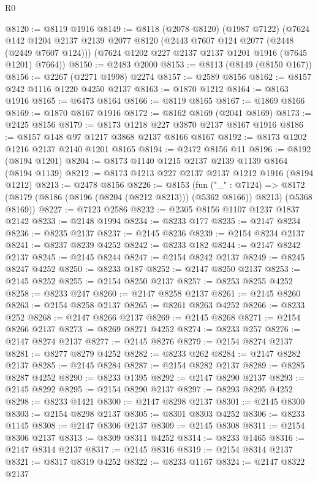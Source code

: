 \begin{lexlean}{R0}
\begin{coremodule}
@8120 := @8119 @1916
@8149 := @8118
    (@2078 @8120)
    (@1987 @7122)
    (@7624
      @142
      @1204
      @2137
      @2139
      @2077
      @8120
      (@2443 @7607 @124 @2077 (@2448 (@2449 @7607 @124)))
      (@7624 @1202 @227 @2137 @2137 @1201 @1916 (@7645 @1201) @7664))
@8150 := @2483 @2000
@8153 := @8113 (@8149 (@8150 @167))
@8156 := @2267 (@2271 @1998) @2274
@8157 := @2589 @8156
@8162 := @8157 @242 @1116 @1220 @4250 @2137
@8163 := @1870 @1212
@8164 := @8163 @1916
@8165 := @6473 @8164
@8166 := @8119 @8165
@8167 := @1869 @8166
@8169 := @1870 @8167 @1916
@8172 := @8162 @8169 (@2041 @8169)
@8173 := @2425 @8156
@8179 := @8173 @1218 @227 @3870 @2137 @8167 @1916
@8186 := @8157 @148 @97 @1217 @3868 @2137 @8166 @8167
@8192 := @8173 @1202 @1216 @2137 @2140 @1201 @8165
@8194 := @2472 @8156 @11
@8196 := @8192 (@8194 @1201)
@8204 := @8173 @1140 @1215 @2137 @2139 @1139 @8164 (@8194 @1139)
@8212 := @8173 @1213 @227 @2137 @2137 @1212 @1916 (@8194 @1212)
@8213 := @2478 @8156
@8226 := @8153
    (fun ("_" : @7124) =>
    @8172 (@8179 (@8186 (@8196 (@8204 (@8212 @8213))) (@5362 @8166)) @8213) (@5368 @8169))
@8227 := @7123 @2586
@8232 := @2305 @8156 @1107 @1237 @1837 @2142
@8233 := @2148 @1994
@8234 := @8233 @177
@8235 := @2147 @8234
@8236 := @8235 @2137
@8237 := @2145 @8236
@8239 := @2154 @8234 @2137
@8241 := @8237 @8239 @4252
@8242 := @8233 @182
@8244 := @2147 @8242 @2137
@8245 := @2145 @8244
@8247 := @2154 @8242 @2137
@8249 := @8245 @8247 @4252
@8250 := @8233 @187
@8252 := @2147 @8250 @2137
@8253 := @2145 @8252
@8255 := @2154 @8250 @2137
@8257 := @8253 @8255 @4252
@8258 := @8233 @247
@8260 := @2147 @8258 @2137
@8261 := @2145 @8260
@8263 := @2154 @8258 @2137
@8265 := @8261 @8263 @4252
@8266 := @8233 @252
@8268 := @2147 @8266 @2137
@8269 := @2145 @8268
@8271 := @2154 @8266 @2137
@8273 := @8269 @8271 @4252
@8274 := @8233 @257
@8276 := @2147 @8274 @2137
@8277 := @2145 @8276
@8279 := @2154 @8274 @2137
@8281 := @8277 @8279 @4252
@8282 := @8233 @262
@8284 := @2147 @8282 @2137
@8285 := @2145 @8284
@8287 := @2154 @8282 @2137
@8289 := @8285 @8287 @4252
@8290 := @8233 @1395
@8292 := @2147 @8290 @2137
@8293 := @2145 @8292
@8295 := @2154 @8290 @2137
@8297 := @8293 @8295 @4252
@8298 := @8233 @1421
@8300 := @2147 @8298 @2137
@8301 := @2145 @8300
@8303 := @2154 @8298 @2137
@8305 := @8301 @8303 @4252
@8306 := @8233 @1145
@8308 := @2147 @8306 @2137
@8309 := @2145 @8308
@8311 := @2154 @8306 @2137
@8313 := @8309 @8311 @4252
@8314 := @8233 @1465
@8316 := @2147 @8314 @2137
@8317 := @2145 @8316
@8319 := @2154 @8314 @2137
@8321 := @8317 @8319 @4252
@8322 := @8233 @1167
@8324 := @2147 @8322 @2137

\end{coremodule}
\end{lexlean}
